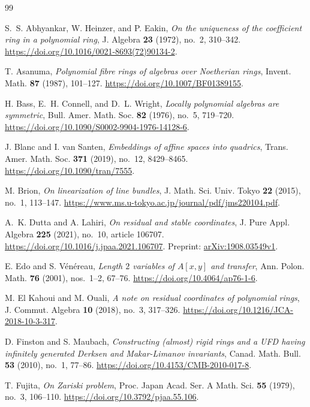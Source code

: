 \begin{thebibliography}{99}

S.~S. Abhyankar, W. Heinzer, and P. Eakin,
\emph{On the uniqueness of the coefficient ring in a polynomial ring},
J. Algebra \textbf{23} (1972), no.~2, 310--342.
\url{https://doi.org/10.1016/0021-8693(72)90134-2}.

T. Asanuma,
\emph{Polynomial fibre rings of algebras over Noetherian rings},
Invent. Math. \textbf{87} (1987), 101--127.
\url{https://doi.org/10.1007/BF01389155}.

H. Bass, E.~H. Connell, and D.~L. Wright,
\emph{Locally polynomial algebras are symmetric},
Bull. Amer. Math. Soc. \textbf{82} (1976), no.~5, 719--720.
\url{https://doi.org/10.1090/S0002-9904-1976-14128-6}.

J. Blanc and I. van Santen,
\emph{Embeddings of affine spaces into quadrics},
Trans. Amer. Math. Soc. \textbf{371} (2019), no.~12, 8429--8465.
\url{https://doi.org/10.1090/tran/7555}.

M. Brion,
\emph{On linearization of line bundles},
J. Math. Sci. Univ. Tokyo \textbf{22} (2015), no.~1, 113--147.
\url{https://www.ms.u-tokyo.ac.jp/journal/pdf/jms220104.pdf}.

A.~K. Dutta and A. Lahiri,
\emph{On residual and stable coordinates},
J. Pure Appl. Algebra \textbf{225} (2021), no.~10, article 106707.
\url{https://doi.org/10.1016/j.jpaa.2021.106707}.
Preprint: \href{https://arxiv.org/abs/1908.03549v1}{arXiv:1908.03549v1}.

E. Edo and S. V\'en\'ereau,
\emph{Length $2$ variables of $A[x,y]$ and transfer},
Ann. Polon. Math. \textbf{76} (2001), nos.~1--2, 67--76.
\url{https://doi.org/10.4064/ap76-1-6}.

M. El Kahoui and M. Ouali,
\emph{A note on residual coordinates of polynomial rings},
J. Commut. Algebra \textbf{10} (2018), no.~3, 317--326.
\url{https://doi.org/10.1216/JCA-2018-10-3-317}.

D. Finston and S. Maubach,
\emph{Constructing (almost) rigid rings and a UFD having infinitely
 generated Derksen and Makar-Limanov invariants},
Canad. Math. Bull. \textbf{53} (2010), no.~1, 77--86.
\url{https://doi.org/10.4153/CMB-2010-017-8}.

T. Fujita,
\emph{On Zariski problem},
Proc. Japan Acad. Ser. A Math. Sci. \textbf{55} (1979), no.~3, 106--110.
\url{https://doi.org/10.3792/pjaa.55.106}.


\end{thebibliography}
